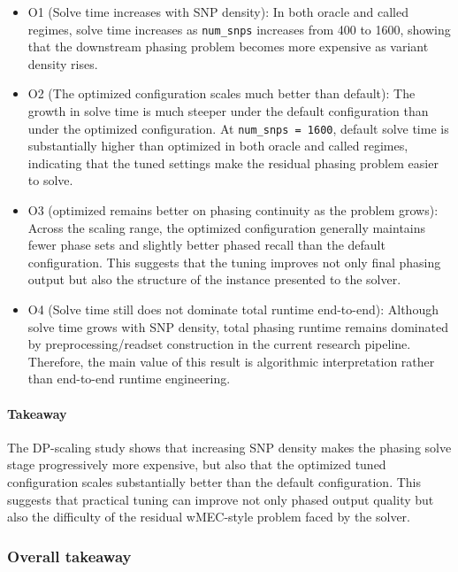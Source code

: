 \documentclass[
]{article}
\begin{document}
\begin{itemize}
\item
  O1 (Solve time increases with SNP density): In both oracle and called
  regimes, solve time increases as \texttt{num\_snps} increases from 400
  to 1600, showing that the downstream phasing problem becomes more
  expensive as variant density rises.
\item
  O2 (The optimized configuration scales much better than default): The
  growth in solve time is much steeper under the default configuration
  than under the optimized configuration. At
  \texttt{num\_snps\ =\ 1600}, default solve time is substantially
  higher than optimized in both oracle and called regimes, indicating
  that the tuned settings make the residual phasing problem easier to
  solve.
\item
  O3 (optimized remains better on phasing continuity as the problem
  grows): Across the scaling range, the optimized configuration
  generally maintains fewer phase sets and slightly better phased recall
  than the default configuration. This suggests that the tuning improves
  not only final phasing output but also the structure of the instance
  presented to the solver.
\item
  O4 (Solve time still does not dominate total runtime end-to-end):
  Although solve time grows with SNP density, total phasing runtime
  remains dominated by preprocessing/readset construction in the current
  research pipeline. Therefore, the main value of this result is
  algorithmic interpretation rather than end-to-end runtime engineering.
\end{itemize}

\paragraph{Takeaway}\label{takeaway-17}

The DP-scaling study shows that increasing SNP density makes the phasing
solve stage progressively more expensive, but also that the optimized
tuned configuration scales substantially better than the default
configuration. This suggests that practical tuning can improve not only
phased output quality but also the difficulty of the residual wMEC-style
problem faced by the solver.

\subsubsection{Overall takeaway}\label{overall-takeaway}
\end{document}
